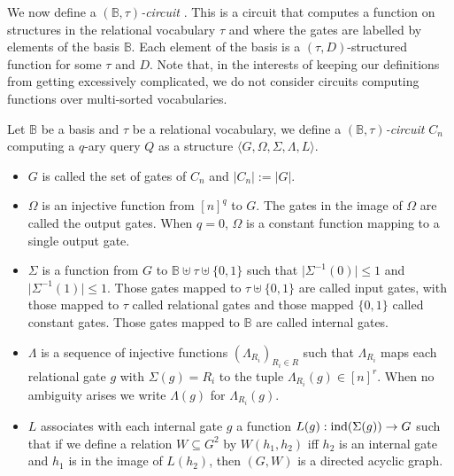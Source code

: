 \documentclass[../paper.tex]{subfiles}
\begin{document}
We now define a \emph{$(\mathbb{B}, \tau)$-circuit} . This is a circuit that
computes a function on structures in the relational vocabulary $\tau$ and where
the gates are labelled by elements of the basis $\mathbb{B}$. Each element of
the basis is a $(\tau,D)$-structured function for some $\tau$ and $D$. Note
that, in the interests of keeping our definitions from getting excessively
complicated, we do not consider circuits computing functions over multi-sorted
vocabularies.
\begin{definition}
  Let $\mathbb{B}$ be a basis and $\tau$ be a relational vocabulary, we define a
  \emph{$(\mathbb{B}, \tau)$-circuit} $C_n$ computing a $q$-ary query $Q$ as a
  structure $\langle G, \Omega, \Sigma, \Lambda, L \rangle$.
  \begin{itemize}
    \setlength\itemsep{0mm}
  \item $G$ is called the set of gates of $C_n$ and $\vert C_n \vert := \vert G
    \vert$.
  \item $\Omega$ is an injective function from $[n]^q$ to $G$. The gates in the
    image of $\Omega$ are called the output gates. When $q = 0$, $\Omega$ is a
    constant function mapping to a single output gate.
  \item $\Sigma$ is a function from $G$ to $\mathbb{B} \uplus \tau \uplus
    \{0,1\} $ such that $\vert \Sigma^{-1} (0) \vert \leq 1$ and $\vert
    \Sigma^{-1} (1) \vert \leq 1$. Those gates mapped to $\tau \uplus \{0,1\}$
    are called input gates, with those mapped to $\tau$ called relational gates
    and those mapped $\{0,1\}$ called constant gates. Those gates mapped to
    $\mathbb{B}$ are called internal gates.
  \item $\Lambda$ is a sequence of injective functions $(\Lambda_{R_i})_{R_i \in
      R}$ such that $\Lambda_{R_i}$ maps each relational gate $g$ with $\Sigma
    (g) = R_i$ to the tuple $\Lambda_{R_i} (g) \in [n]^{r}$. When no ambiguity
    arises we write $\Lambda (g)$ for $\Lambda_{R_i} (g)$.
  \item $L$ associates with each internal gate $g$ a function $L(g):
    \text{\upshape ind}(\Sigma(g)) \rightarrow G$ such that if we define a relation $W
    \subseteq G^{2}$ by $W(h_1,h_2)$ iff $h_2$ is an internal gate and $h_1$ is
    in the image of $L(h_2)$, then $(G, W)$ is a directed acyclic graph.
  \end{itemize}
\end{definition}
\end{document}
